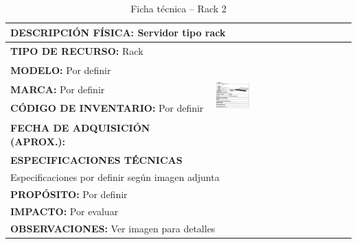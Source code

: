 \begin{table}[H]
\centering
\caption{Ficha técnica -- Rack 2}
\label{tab:rack-2}
\begin{tabular}{|p{}|p{}|}
\hline
\multicolumn{2}{|l|}{\textbf{DESCRIPCIÓN FÍSICA:} Servidor tipo rack} \\ \hline
\textbf{TIPO DE RECURSO:} Rack & 
\multirow{5}{*}{\includegraphics[width=0.25\textwidth,height=4cm,keepaspectratio]{tablas-images/cp1/racks/rack-2.png}} \\ \cline{1-1}
\textbf{MODELO:} Por definir & \\ \cline{1-1}
\textbf{MARCA:} Por definir & \\ \cline{1-1}
\textbf{CÓDIGO DE INVENTARIO:} Por definir & \\ \cline{1-1}
\textbf{FECHA DE ADQUISICIÓN (APROX.):} & \\ \hline
\multicolumn{2}{|l|}{\textbf{ESPECIFICACIONES TÉCNICAS}} \\ \hline
\multicolumn{2}{|p{0.95\textwidth}|}{
\footnotesize
Especificaciones por definir según imagen adjunta
} \\ \hline
\multicolumn{2}{|l|}{\textbf{PROPÓSITO:} Por definir} \\ \hline
\multicolumn{2}{|l|}{\textbf{IMPACTO:} Por evaluar} \\ \hline
\multicolumn{2}{|l|}{\textbf{OBSERVACIONES:} Ver imagen para detalles} \\ \hline
\end{tabular}
\end{table}



